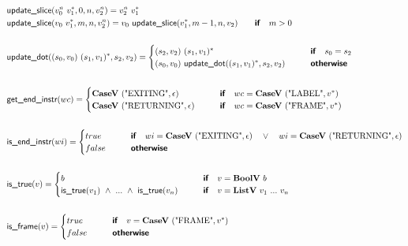 \begin{align*}
  &\updateslice(v_0^n ~ \seq{v_1}, 0, n, v_2^n) = v_2^n ~ \seq{v_1} \\
  &\updateslice(v_0 ~ \seq{v_1}, m, n, v_2^n) =  v_0 ~ \updateslice(\seq{v_1}, m-1, n, v_2)
  \quad\quad\premise{if}\quad m > 0 \\
%
\newline \\
  &\updatedot((s_0, v_0) ~ \seq{(s_1, v_1)}, s_2, v_2) =
  \begin{cases}
    (s_2, v_2) ~ \seq{(s_1, v_1)}
    &\quad\quad\premise{if}\quad s_0 = s_2 \\
    (s_0, v_0) ~ \updatedot(\seq{(s_1, v_1)}, s_2, v_2)
    &\quad\quad\premise{otherwise}
  \end{cases}
  \\
%
\newline \\
  &\getendinstr(wc) =
  \begin{cases}
    \casev ~ (\text{"EXITING"}, \epsilon) &\quad\quad\premise{if}\quad wc = \casev ~ (\text{"LABEL"}, \seq v)\\
    \casev ~ (\text{"RETURNING"}, \epsilon) &\quad\quad\premise{if}\quad wc = \casev ~ (\text{"FRAME"}, \seq v)
  \end{cases} \\
%
\newline \\
  &\isendinstr(wi) =
  \begin{cases}
    true &\quad\quad\premise{if}\quad wi = \casev ~ (\text{"EXITING"}, \epsilon) \quad\lor\quad wi = \casev ~ (\text{"RETURNING"}, \epsilon)\\
    false &\quad\quad\premise{otherwise}
  \end{cases} \\
%
\newline \\
  &\istrue(v) =
  \begin{cases}
  b &\quad\quad\premise{if}\quad v = \boolv ~ b \\
    \istrue(v_1) ~ \land ~ ... ~ \land ~ \istrue(v_n) &\quad\quad\premise{if}\quad
    v = \listv ~ v_1 ~ ... ~ v_n \\
  \end{cases} \\
%
\newline \\
  &\isframe(v) =
  \begin{cases}
    true
    &\quad\quad\premise{if}\quad v = \casev ~ (\text{"FRAME"}, \seq v) \\
    false &\quad\quad\premise{otherwise}\\
  \end{cases}
  \\
\end{align*}





